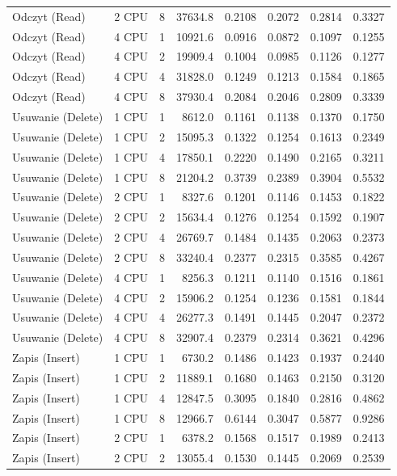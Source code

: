 \begin{table}[ht]
{\begin{tabular}{llcrrrrr}
Odczyt (Read) & 2 CPU & 8 & 37634.8 & 0.2108 & 0.2072 & 0.2814 & 0.3327 \\
Odczyt (Read) & 4 CPU & 1 & 10921.6 & 0.0916 & 0.0872 & 0.1097 & 0.1255 \\
Odczyt (Read) & 4 CPU & 2 & 19909.4 & 0.1004 & 0.0985 & 0.1126 & 0.1277 \\
Odczyt (Read) & 4 CPU & 4 & 31828.0 & 0.1249 & 0.1213 & 0.1584 & 0.1865 \\
Odczyt (Read) & 4 CPU & 8 & 37930.4 & 0.2084 & 0.2046 & 0.2809 & 0.3339 \\
Usuwanie (Delete) & 1 CPU & 1 & 8612.0 & 0.1161 & 0.1138 & 0.1370 & 0.1750 \\
Usuwanie (Delete) & 1 CPU & 2 & 15095.3 & 0.1322 & 0.1254 & 0.1613 & 0.2349 \\
Usuwanie (Delete) & 1 CPU & 4 & 17850.1 & 0.2220 & 0.1490 & 0.2165 & 0.3211 \\
Usuwanie (Delete) & 1 CPU & 8 & 21204.2 & 0.3739 & 0.2389 & 0.3904 & 0.5532 \\
Usuwanie (Delete) & 2 CPU & 1 & 8327.6 & 0.1201 & 0.1146 & 0.1453 & 0.1822 \\
Usuwanie (Delete) & 2 CPU & 2 & 15634.4 & 0.1276 & 0.1254 & 0.1592 & 0.1907 \\
Usuwanie (Delete) & 2 CPU & 4 & 26769.7 & 0.1484 & 0.1435 & 0.2063 & 0.2373 \\
Usuwanie (Delete) & 2 CPU & 8 & 33240.4 & 0.2377 & 0.2315 & 0.3585 & 0.4267 \\
Usuwanie (Delete) & 4 CPU & 1 & 8256.3 & 0.1211 & 0.1140 & 0.1516 & 0.1861 \\
Usuwanie (Delete) & 4 CPU & 2 & 15906.2 & 0.1254 & 0.1236 & 0.1581 & 0.1844 \\
Usuwanie (Delete) & 4 CPU & 4 & 26277.3 & 0.1491 & 0.1445 & 0.2047 & 0.2372 \\
Usuwanie (Delete) & 4 CPU & 8 & 32907.4 & 0.2379 & 0.2314 & 0.3621 & 0.4296 \\
Zapis (Insert) & 1 CPU & 1 & 6730.2 & 0.1486 & 0.1423 & 0.1937 & 0.2440 \\
Zapis (Insert) & 1 CPU & 2 & 11889.1 & 0.1680 & 0.1463 & 0.2150 & 0.3120 \\
Zapis (Insert) & 1 CPU & 4 & 12847.5 & 0.3095 & 0.1840 & 0.2816 & 0.4862 \\
Zapis (Insert) & 1 CPU & 8 & 12966.7 & 0.6144 & 0.3047 & 0.5877 & 0.9286 \\
Zapis (Insert) & 2 CPU & 1 & 6378.2 & 0.1568 & 0.1517 & 0.1989 & 0.2413 \\
Zapis (Insert) & 2 CPU & 2 & 13055.4 & 0.1530 & 0.1445 & 0.2069 & 0.2539 \\

\end{tabular}}
\end{table}
